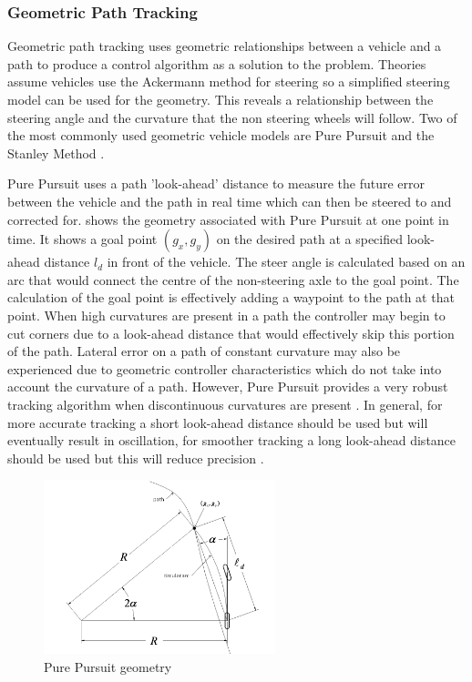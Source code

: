 \documentclass[main.tex]{subfiles}
\begin{document}
\subsubsection{Geometric Path Tracking}
Geometric path tracking uses geometric relationships between a vehicle and a path to produce a control algorithm as a solution to the problem. Theories assume vehicles use the Ackermann method for steering so a simplified steering model can be used for the geometry. This reveals a relationship between the steering angle and the curvature that the non steering wheels will follow. Two of the most commonly used geometric vehicle models are Pure Pursuit and the Stanley Method \parencite{snider2009}.

Pure Pursuit uses a path 'look-ahead' distance to measure the future error between the vehicle and the path in real time which can then be steered to and corrected for.  shows the geometry associated with Pure Pursuit at one point in time. It shows a goal point $(g_x, g_y)$ on the desired path at a specified look-ahead distance $l_d$ in front of the vehicle. The steer angle is calculated based on an arc that would connect the centre of the non-steering axle to the goal point. The calculation of the goal point is effectively adding a waypoint to the path at that point. When high curvatures are present in a path the controller may begin to cut corners due to a look-ahead distance that would effectively skip this portion of the path. Lateral error on a path of constant curvature may also be experienced due to geometric controller characteristics which do not take into account the curvature of a path. However, Pure Pursuit provides a very robust tracking algorithm when discontinuous curvatures are present \parencite{snider2009}. In general, for more accurate tracking a short look-ahead distance should be used but will eventually result in oscillation, for smoother tracking a long look-ahead distance should be used but this will reduce precision \parencite{snider2009}.
\begin{figure}[ht]
\includegraphics[width=0.6\textwidth]{3-LiteratureReview/purePursuitGoal.png}
\centering
\caption[Pure Pursuit geometry]{Pure Pursuit geometry \parencite{snider2009}} 
\end{figure}
\end{document}
